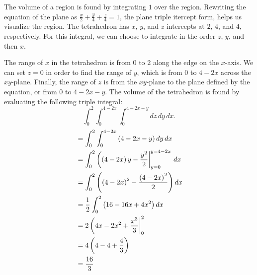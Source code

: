\documentclass[12pt]{article}
\begin{document}
The volume of a region is found by integrating $1$ over the region. Rewriting the equation of the plane
as $\frac{x}{2}+\frac{y}{4}+\frac{z}{4}=1$, the plane triple itercept form, helps us visualize the region. The tetrahedron has
$x$, $y$, and $z$ intercepts at $2$, $4$, and $4$, respectively. For this integral, we can choose to integrate in the order $z$,
$y$, and then $x$.\double

The range of $x$ in the tetrahedron is from $0$ to $2$ along the edge on the $x$-axis. We can set $z=0$ in order to
find the range of $y$, which is from $0$ to $4-2x$ across the $xy$-plane. Finally, the range of $z$ is from the $xy$-plane to the
plane defined by the equation, or from $0$ to $4-2x-y$. The volume of the tetrahedron is found by evaluating the following
triple integral:
%
\begin{equation*}
\int_0^2\int_0^{4-2x}\int_0^{4-2x-y}dz\,dy\,dx.
\end{equation*}
\begin{align*}
&=\int_0^2\int_0^{4-2x}\left({4-2x-y}\right)dy\,dx\\
&=\int_0^2\left(\left({4-2x}\right)y-\frac{y^2}{2}\right|_{y=0}^{y=4-2x}\,dx\\
&=\int_0^2\left({\left({4-2x}\right)^2-\frac{\left({4-2x}\right)^2}{2}}\right)dx\\
&=\frac{1}{2}\int_0^2\left({16-16x+4x^2}\right)dx\\
&=2\left(4x-2x^2+\frac{x^3}{3}\right|_0^2\\
&=4\left({4-4+\frac{4}{3}}\right)\\
&=\frac{16}{3}
\end{align*}
\end{document}
